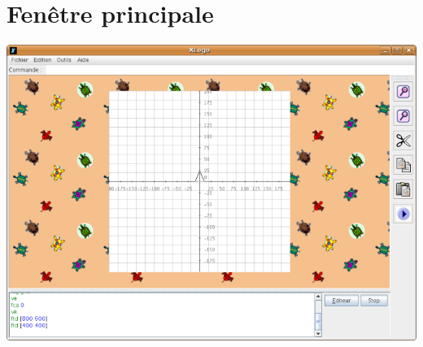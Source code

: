 \section{Fenêtre principale}
\begin{center}
\includegraphics[scale=0.45]{images/Capture.png} 
\end{center}
